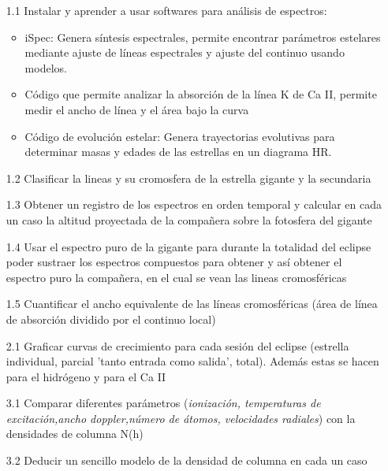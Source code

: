 \documentclass[11pt]{article}
\begin{document}
\begin{itemize}

\item[1.1] Instalar y aprender a usar softwares para análisis de espectros:
\begin{itemize}
    \item iSpec: Genera síntesis espectrales, permite encontrar parámetros estelares mediante ajuste de líneas espectrales y ajuste del continuo usando modelos.
    \item Código que permite analizar la absorción de la línea K de Ca II, permite medir el ancho de línea y el área bajo la curva
    \item Código de evolución estelar: Genera trayectorias evolutivas para determinar masas y edades de las estrellas en un diagrama HR.
\end{itemize}
\item[1.2] Clasificar la lineas y su cromosfera de la estrella gigante y la secundaria
\item[1.3] Obtener un registro de los espectros en orden temporal y calcular en cada un caso la altitud proyectada de la compañera sobre la fotosfera del gigante

\item[1.4]  Usar el espectro puro de la gigante para durante la totalidad del eclipse poder sustraer los espectros compuestos para obtener y así obtener el espectro puro la compañera, en el cual se vean las lineas cromosféricas

\item[1.5] Cuantificar el ancho equivalente de las líneas cromosféricas (área de línea de absorción dividido por el continuo local)

\item[2.1] Graficar curvas de crecimiento para cada sesión del eclipse (estrella individual, parcial 'tanto entrada como salida', total). Además estas se hacen para el hidrógeno y para el Ca II 

\item[3.1] Comparar diferentes parámetros (\textit{ionización, temperaturas de excitación,ancho doppler,número de átomos, velocidades radiales}) con la densidades de columna N(h)

\item[3.2] Deducir un sencillo modelo de la densidad de columna en cada un caso

\end{itemize}
\end{document}
